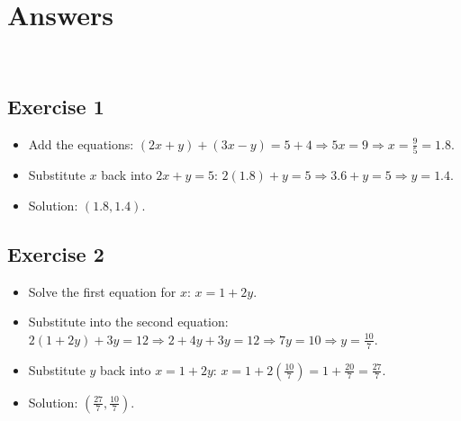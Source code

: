 \documentclass[12pt]{article}
\begin{document}
\section*{Answers}\\
\subsection*{Exercise 1}
\begin{itemize}
    \item Add the equations: \( (2x + y) + (3x - y) = 5 + 4 \Rightarrow 5x = 9 \Rightarrow x = \frac{9}{5} = 1.8 \).
    \item Substitute \( x \) back into \( 2x + y = 5 \): \( 2(1.8) + y = 5 \Rightarrow 3.6 + y = 5 \Rightarrow y = 1.4 \).
    \item Solution: \( (1.8, 1.4) \).
\end{itemize}

\subsection*{Exercise 2}
\begin{itemize}
    \item Solve the first equation for \( x \): \( x = 1 + 2y \).
    \item Substitute into the second equation: \( 2(1 + 2y) + 3y = 12 \Rightarrow 2 + 4y + 3y = 12 \Rightarrow 7y = 10 \Rightarrow y = \frac{10}{7} \).
    \item Substitute \( y \) back into \( x = 1 + 2y \): \( x = 1 + 2\left(\frac{10}{7}\right) = 1 + \frac{20}{7} = \frac{27}{7} \).
    \item Solution: \( \left( \frac{27}{7}, \frac{10}{7} \right) \).
\end{itemize}
\end{document}
